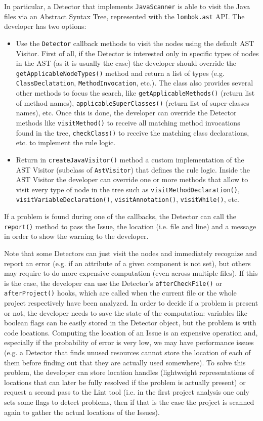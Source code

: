 \documentclass[11pt,a4paper,notitlepage]{article}
\begin{document}
In particular, a Detector that implements \texttt{JavaScanner} is able to visit the Java files via an Abstract Syntax Tree, represented with the \texttt{lombok.ast} API. The developer has two options:
\begin{itemize}
	\item Use the \texttt{Detector} callback methods to visit the nodes using the default AST Visitor. First of all, if the Detector is interested only in specific types of nodes in the AST (as it is usually the case) the developer should override the \texttt{getApplicableNodeTypes()} method and return a list of types (e.g. \texttt{ClassDeclatation}, \texttt{MethodInvocation}, etc.). The class also provides several other methods to focus the search, like \texttt{getApplicableMethods()} (return list of method names), \texttt{applicableSuperClasses()} (return list of super-classes names), etc. Once this is done, the developer can override the Detector methods like \texttt{visitMethod()} to receive all matching method invocations found in the tree, \texttt{checkClass()} to receive the matching class declarations, etc. to implement the rule logic.
	\item Return in \texttt{createJavaVisitor()} method a custom implementation of the AST Visitor (subclass of \texttt{AstVisitor}) that defines the rule logic. Inside the AST Visitor the developer can override one or more methods that allow to visit every type of node in the tree such as \texttt{visitMethodDeclaration()}, \texttt{visitVariableDeclaration()}, \texttt{visitAnnotation()}, \texttt{visitWhile()}, etc. 
\end{itemize}
If a problem is found during one of the callbacks, the Detector can call the \texttt{report()} method to pass the Issue, the location (i.e. file and line) and a message in order to show the warning to the developer.

Note that some Detectors can just visit the nodes and immediately recognize and report an error (e.g. if an attribute of a given component is not set), but others may require to do more expensive computation (even across multiple files). If this is the case, the developer can use the Detector's \texttt{afterCheckFile()} or \texttt{afterProject()} hooks, which are called when the current file or the whole project respectively have been analyzed. In order to decide if a problem is present or not, the developer needs to save the state of the computation: variables like boolean flags can be easily stored in the Detector object, but the problem is with code locations. Computing the location of an Issue is an expensive operation and, especially if the probability of error is very low, we may have performance issues (e.g. a Detector that finds unused resources cannot store the location of each of them before finding out that they are actually used somewhere). To solve this problem, the developer can store location handles (lightweight representations of locations that can later be fully resolved if the problem is actually present) or request a second pass to the Lint tool (i.e. in the first project analysis one only sets some flags to detect problems, then if that is the case the project is scanned again to gather the actual locations of the Issues).
\end{document}
